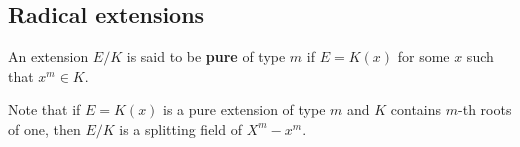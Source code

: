 %
%
%
%
%
%
%
%    


\subsection{Radical extensions}

\begin{definition}
    An extension $E/K$ is said to be \textbf{pure} of type $m$ if 
    $E=K(x)$ for some $x$ such that $x^m\in K$. 
\end{definition}

Note that if $E=K(x)$ is a pure extension of type $m$ and $K$ contains 
$m$-th roots of one, then $E/K$ is a splitting field of $X^m-x^m$. 

